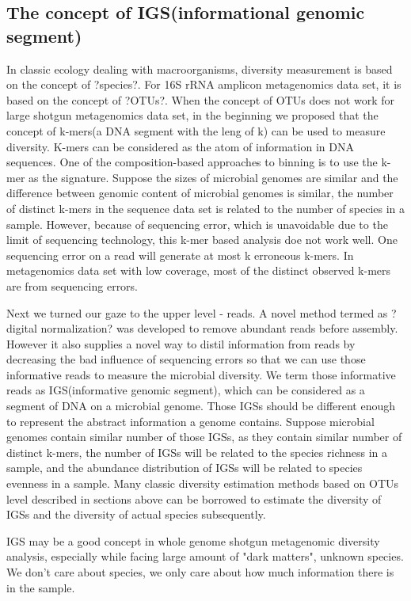 \documentclass{article}
\begin{document}
\subsection{The concept of IGS(informational genomic segment)}

In classic ecology dealing with macroorganisms, diversity measurement is based on the concept of ?species?. For 16S rRNA amplicon metagenomics data set, it is based on the concept of ?OTUs?. When the concept of OTUs does not work for large shotgun metagenomics data set, in the beginning we proposed that the concept of k-mers(a DNA segment with the leng of k) can be used to measure diversity. K-mers can be considered as the atom of information in DNA sequences. One of the composition-based approaches to binning is to use the k-mer as the signature. Suppose the sizes of microbial genomes are similar and the difference between genomic content of microbial genomes is similar, the number of distinct k-mers in the sequence data set is related to the number of species in a sample. However, because of sequencing error, which is unavoidable due to the limit of sequencing technology, this k-mer based analysis doe not work well. One sequencing error on a read will generate at most k erroneous k-mers. In metagenomics data set with low coverage, most of the distinct observed k-mers are from sequencing errors.


Next we turned our gaze to the upper level - reads. A novel method termed as ?digital normalization? was developed to remove abundant reads before assembly. However it also supplies a novel way to distil information from reads by decreasing the bad influence of sequencing errors so that we can use those informative reads to measure the microbial diversity. We term those informative reads as IGS(informative genomic segment), which can be considered as a segment of DNA on a microbial genome. Those IGSs should be different enough to represent the abstract information a genome contains. Suppose microbial genomes contain similar number of those IGSs, as they contain similar number of distinct k-mers, the number of IGSs will be related to the species richness in a sample, and the abundance distribution of IGSs will be related to species evenness in a sample. Many classic diversity estimation methods based on OTUs level described in sections above can be borrowed to estimate the diversity of IGSs and the diversity of actual species subsequently.

IGS may be a good concept in whole genome shotgun metagenomic diversity analysis, especially while facing large amount of "dark matters", unknown species. We don't care about species, we only care about how much information there is in the sample.
\end{document}
